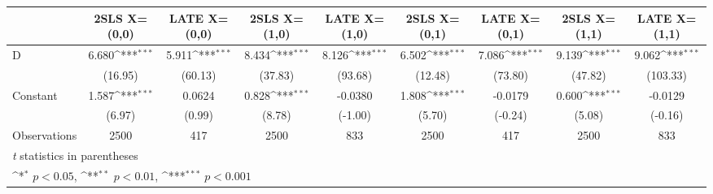 \def\sym#1{\ifmmode^{#1}\else\(^{#1}\)\fi}
\begin{adjustbox}{max
width={\textwidth},caption={Unconditional and conditional LATEs \label{tab:IV-2SLS-IV-Wald-CP}},nofloat=table}
\begin{tabular}{l*{8}{c}}
\toprule
                    &\multicolumn{1}{c}{2SLS X=(0,0)}&\multicolumn{1}{c}{LATE X=(0,0)}&\multicolumn{1}{c}{2SLS X=(1,0)}&\multicolumn{1}{c}{LATE X=(1,0)}&\multicolumn{1}{c}{2SLS X=(0,1)}&\multicolumn{1}{c}{LATE X=(0,1)}&\multicolumn{1}{c}{2SLS X=(1,1)}&\multicolumn{1}{c}{LATE X=(1,1)}\\
\midrule
D                   &       6.680\sym{***}&       5.911\sym{***}&       8.434\sym{***}&       8.126\sym{***}&       6.502\sym{***}&       7.086\sym{***}&       9.139\sym{***}&       9.062\sym{***}\\
                    &     (16.95)         &     (60.13)         &     (37.83)         &     (93.68)         &     (12.48)         &     (73.80)         &     (47.82)         &    (103.33)         \\
\addlinespace
Constant            &       1.587\sym{***}&      0.0624         &       0.828\sym{***}&     -0.0380         &       1.808\sym{***}&     -0.0179         &       0.600\sym{***}&     -0.0129         \\
                    &      (6.97)         &      (0.99)         &      (8.78)         &     (-1.00)         &      (5.70)         &     (-0.24)         &      (5.08)         &     (-0.16)         \\
\midrule
Observations        &        2500         &         417         &        2500         &         833         &        2500         &         417         &        2500         &         833         \\
\bottomrule
\multicolumn{9}{p{\textwidth}}{\centering \footnotesize \textit{t} statistics in parentheses}\\
\multicolumn{9}{p{\textwidth}}{\centering \footnotesize \sym{*} \(p<0.05\), \sym{**} \(p<0.01\), \sym{***} \(p<0.001\)}\\
\end{tabular}\end{adjustbox}
